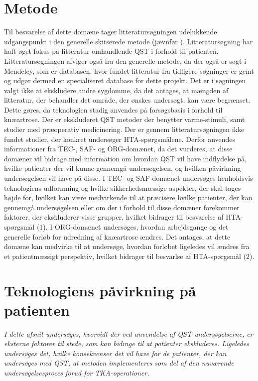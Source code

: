 \section{Metode}
Til besvarelse af dette domæne tager litteratursøgningen udelukkende udgangspunkt i den generelle skitserede metode (jævnfør ). Litteratursøgning har haft øget fokus på litteratur omhandlende QST i forhold til patienten. Litteratursøgningen afviger også fra den generelle metode, da der også er søgt i Mendeley, som er databasen, hvor fundet litteratur fra tidligere søgninger er gemt og udgør dermed en specialiseret database for dette projekt.  Det er i søgningen valgt ikke at ekskludere andre sygdomme, da det antages, at mængden af litteratur, der behandler det område, der ønskes undersøgt, kan være begrænset. Dette gøres, da teknologien stadig anvendes på forsøgsbasis i forhold til knæartrose. Der er ekskluderet QST metoder der benytter varme-stimuli, samt studier med præoperativ medicinering. Der er gennem litteratursøgningen ikke fundet studier, der konkret undersøger HTA-spørgsmålene. Derfor anvendes informationer fra TEC-, SAF- og ORG-domænet, da det vurderes, at disse domæner vil bidrage med information om hvordan QST vil have indflydelse på, hvilke patienter der vil kunne gennemgå undersøgelsen, og hvilken påvirkning undersøgelsen vil have på disse. I TEC- og SAF-domænet undersøges henholdsvis teknologiens udformning og hvilke sikkerhedsmæssige aspekter, der skal tages højde for, hvilket kan være medvirkende til at præcisere hvilke patienter, der kan gennemgå undersøgelsen eller om der i forhold til disse domæner forekommer faktorer, der ekskluderer visse grupper, hvilket bidrager til besvarelse af HTA-spørgsmål (1). I ORG-domænet undersøges, hvordan arbejdsgange og det generelle forløb for udredning af knæartrose ændres. Det antages, at dette domæne kan medvirke til at undersøge, hvordan forløbet ligeledes vil ændres fra et patientmæssigt perspektiv, hvilket bidrager til besvarlse af HTA-spørgsmål (2).     
 
\section{Teknologiens påvirkning på patienten}
\textit{I dette afsnit undersøges, hvorvidt der ved anvendelse af QST-undersøgelserne, er eksterne faktorer til stede, som kan bidrage til at patienter ekskluderes. Ligeledes undersøges det, hvilke konsekvenser det vil have for de patienter, der kan undersøges med QST, at metoden implementeres som del af den nuværende undersøgelsesproces forud for TKA-operationer.}
